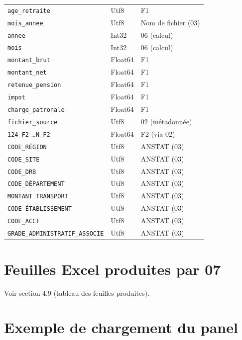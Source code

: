 \documentclass[12pt,a4paper,french]{report}
\begin{document}
\begin{longtable}{lll}
  \texttt{age\_retraite} & Utf8 & F1 \\
  \texttt{mois\_annee} & Utf8 & Nom de fichier (03) \\
  \texttt{annee} & Int32 & 06 (calcul) \\
  \texttt{mois} & Int32 & 06 (calcul) \\
  \texttt{montant\_brut} & Float64 & F1 \\
  \texttt{montant\_net} & Float64 & F1 \\
  \texttt{retenue\_pension} & Float64 & F1 \\
  \texttt{impot} & Float64 & F1 \\
  \texttt{charge\_patronale} & Float64 & F1 \\
  \texttt{fichier\_source} & Utf8 & 02 (métadonnée) \\
  \texttt{124\_F2} \ldots \texttt{N\_F2} & Float64 & F2 (via 02) \\
  \texttt{CODE\_RÉGION} & Utf8 & ANSTAT (03) \\
  \texttt{CODE\_SITE} & Utf8 & ANSTAT (03) \\
  \texttt{CODE\_DRB} & Utf8 & ANSTAT (03) \\
  \texttt{CODE\_DÉPARTEMENT} & Utf8 & ANSTAT (03) \\
  \texttt{MONTANT TRANSPORT} & Utf8 & ANSTAT (03) \\
  \texttt{CODE\_ÉTABLISSEMENT} & Utf8 & ANSTAT (03) \\
  \texttt{CODE\_ACCT} & Utf8 & ANSTAT (03) \\
  \texttt{GRADE\_ADMINISTRATIF\_ASSOCIE} & Utf8 & ANSTAT (03) \\
  \bottomrule
\end{longtable}

\section{Feuilles Excel produites par 07}

Voir section 4.9 (tableau des feuilles produites).

\section{Exemple de chargement du panel}
\end{document}

